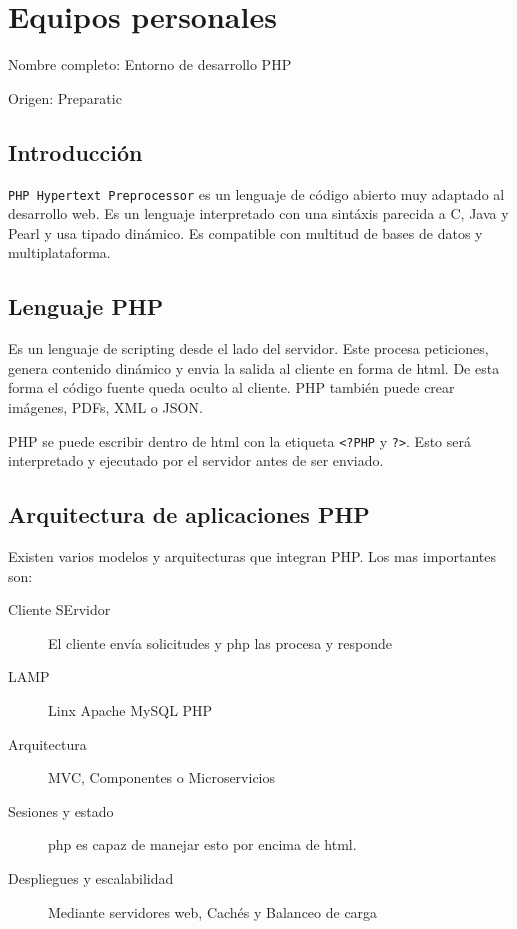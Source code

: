 \setcounter{section}{67}
\section{Equipos personales}

Nombre completo: Entorno de desarrollo PHP

Origen: Preparatic

\subsection{Introducción}
\texttt{PHP Hypertext Preprocessor} es un lenguaje de código abierto muy adaptado al desarrollo web. Es un lenguaje interpretado con una sintáxis parecida a C, Java y Pearl y usa tipado dinámico. Es compatible con multitud de bases de datos y multiplataforma. 

\subsection{Lenguaje PHP}
    Es un lenguaje de scripting desde el lado del servidor. Este procesa peticiones, genera contenido dinámico y envia la salida al cliente en forma de html. De esta forma el código fuente queda oculto al cliente. PHP también puede crear imágenes, PDFs, XML o JSON.

    PHP se puede escribir dentro de html con la etiqueta \texttt{<?PHP} y \texttt{?>}. Esto será interpretado y ejecutado por el servidor antes de ser enviado.

\subsection{Arquitectura de aplicaciones PHP}
    Existen varios modelos y arquitecturas que integran PHP. Los mas importantes son:
    \begin{description}
        \item[Cliente SErvidor] El cliente envía solicitudes y php las procesa y responde
        \item[LAMP] Linx Apache MySQL PHP
        \item[Arquitectura] MVC, Componentes o Microservicios
        \item[Sesiones y estado] php es capaz de manejar esto por encima de html.
        \item[Despliegues y escalabilidad] Mediante servidores web, Cachés y Balanceo de carga
    \end{description}

